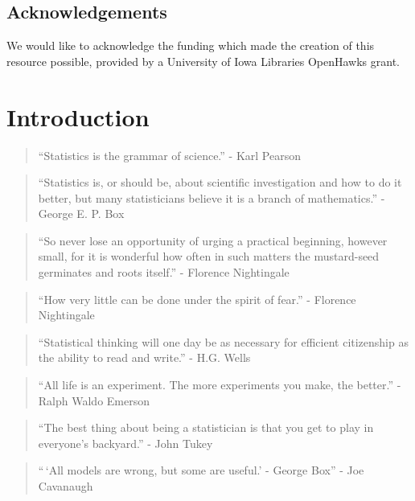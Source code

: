 \documentclass[
]{book}
\theoremstyle{definition}
\theoremstyle{definition}
\theoremstyle{definition}
\theoremstyle{remark}
\begin{document}
\hypertarget{acknowledgements}{%
\section{Acknowledgements}\label{acknowledgements}}

We would like to acknowledge the funding which made the creation of this resource possible, provided by a University of Iowa Libraries OpenHawks grant.

\hypertarget{ch1}{%
\chapter{Introduction}\label{ch1}}

\begin{quote}
``Statistics is the grammar of science.'' - Karl Pearson
\end{quote}

\begin{quote}
``Statistics is, or should be, about scientific investigation and how to do it better, but many statisticians believe it is a branch of mathematics.'' - George E. P. Box
\end{quote}

\begin{quote}
``So never lose an opportunity of urging a practical beginning, however small, for it is wonderful how often in such matters the mustard-seed germinates and roots itself.'' - Florence Nightingale
\end{quote}

\begin{quote}
``How very little can be done under the spirit of fear.'' - Florence Nightingale
\end{quote}

\begin{quote}
``Statistical thinking will one day be as necessary for efficient citizenship as the ability to read and write.'' - H.G. Wells
\end{quote}

\begin{quote}
``All life is an experiment. The more experiments you make, the better.'' - Ralph Waldo Emerson
\end{quote}

\begin{quote}
``The best thing about being a statistician is that you get to play in everyone's backyard.'' - John Tukey
\end{quote}

\begin{quote}
``\,`All models are wrong, but some are useful.' - George Box'' - Joe Cavanaugh
\end{quote}
\end{document}
